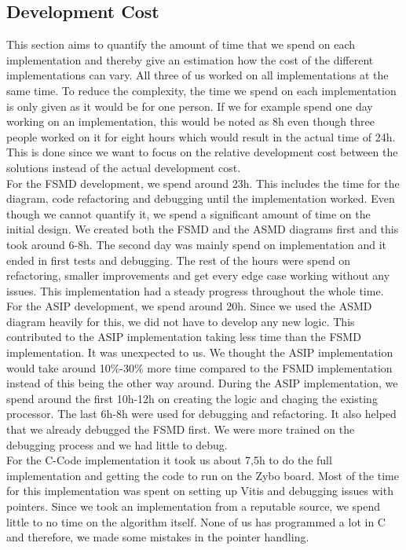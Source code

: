 \documentclass[conference]{IEEEtran}
\begin{document}
\subsection{Development Cost}\label{sec:devcost}
This section aims to quantify the amount of time that we spend on each implementation and thereby give an estimation how the cost of the different implementations can vary. All three of us worked on all implementations at the same time. To reduce the complexity, the time we spend on each implementation is only given as it would be for one person. If we for example spend one day working on an implementation, this would be noted as 8h even though three people worked on it for eight hours which would result in the actual time of 24h. This is done since we want to focus on the relative development cost between the solutions instead of the actual development cost.\\
For the FSMD development, we spend around 23h. This includes the time for the diagram, code refactoring and debugging until the implementation worked. Even though we cannot quantify it, we spend a significant amount of time on the initial design. We created both the FSMD and the ASMD diagrams first and this took around 6-8h. The second day was mainly spend on implementation and it ended in first tests and debugging. The rest of the hours were spend on refactoring, smaller improvements and get every edge case working without any issues. This implementation had a steady progress throughout the whole time.\\
For the ASIP development, we spend around 20h. Since we used the ASMD diagram heavily for this, we did not have to develop any new logic. This contributed to the ASIP implementation taking less time than the FSMD implementation. It was unexpected to us. We thought the ASIP implementation would take around 10\%-30\% more time compared to the FSMD implementation instead of this being the other way around. During the ASIP implementation, we spend around the first 10h-12h on creating the logic and chaging the existing processor. The last 6h-8h were used for debugging and refactoring. It also helped that we already debugged the FSMD first. We were more trained on the debugging process and we had little to debug. \\
For the C-Code implementation it took us about 7,5h to do the full implementation and getting the code to run on the Zybo board. Most of the time for this implementation was spent on setting up Vitis and debugging issues with pointers. Since we took an implementation from a reputable source, we spend little to no time on the algorithm itself. None of us has programmed a lot in C and therefore, we made some mistakes in the pointer handling.\\
\end{document}
